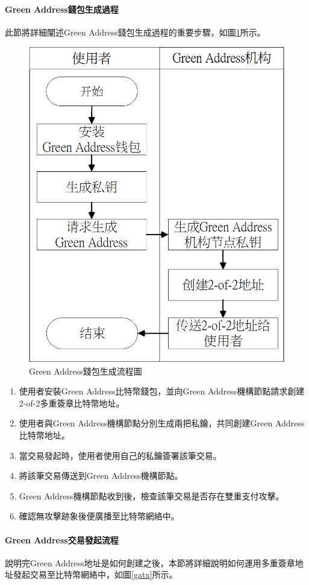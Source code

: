 		 	\paragraph{Green Address錢包生成過程}
		 	此節將詳細闡述Green Address錢包生成過程的重要步驟，如圖\ref{gabuild}所示。
		 	\begin{figure}[htbp]
				\centering
				\includegraphics[width = .5\textwidth]{gabuild.png}
				\caption{Green Address錢包生成流程圖}\label{gabuild}
			\end{figure}

		 	\begin{enumerate}
		 		\item 使用者安裝Green Address比特幣錢包，並向Green Address機構節點請求創建2-of-2多重簽章比特幣地址。
		 		\item 使用者與Green Address機構節點分別生成兩把私鑰，共同創建Green Address比特幣地址。
		 		\item 當交易發起時，使用者使用自己的私鑰簽署該筆交易。
		 		\item 將該筆交易傳送到Green Address機構節點。
		 		\item Green Address機構節點收到後，檢查該筆交易是否存在雙重支付攻擊。
		 		\item 確認無攻擊跡象後便廣播至比特幣網絡中。
		 	\end{enumerate}

		 	\paragraph{Green Address交易發起流程}
		 	說明完Green Address地址是如何創建之後，本節將詳細說明如何運用多重簽章地址發起交易至比特幣網絡中，如圖\ref{gatx}所示。

